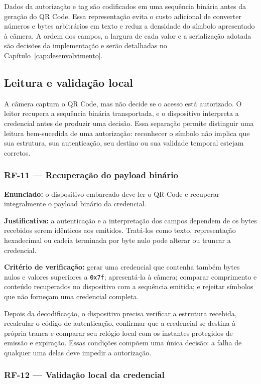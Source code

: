 Dados da autorização e tag são codificados em uma sequência binária antes da geração do QR Code. Essa representação evita o custo adicional de converter números e bytes arbitrários em texto e reduz a densidade do símbolo apresentado à câmera. A ordem dos campos, a largura de cada valor e a serialização adotada são decisões da implementação e serão detalhadas no Capítulo~\ref{cap:desenvolvimento}.

\subsection{Leitura e validação local}

A câmera captura o QR Code, mas não decide se o acesso está autorizado. O leitor recupera a sequência binária transportada, e o dispositivo interpreta a credencial antes de produzir uma decisão. Essa separação permite distinguir uma leitura bem-sucedida de uma autorização: reconhecer o símbolo não implica que sua estrutura, sua autenticação, seu destino ou sua validade temporal estejam corretos.

\subsubsection*{RF-11 --- Recuperação do payload binário}

\textbf{Enunciado:} o dispositivo embarcado deve ler o QR Code e recuperar integralmente o payload binário da credencial.

\textbf{Justificativa:} a autenticação e a interpretação dos campos dependem de os bytes recebidos serem idênticos aos emitidos. Tratá-los como texto, representação hexadecimal ou cadeia terminada por byte nulo pode alterar ou truncar a credencial.

\textbf{Critério de verificação:} gerar uma credencial que contenha também bytes nulos e valores superiores a \texttt{0x7f}; apresentá-la à câmera; comparar comprimento e conteúdo recuperados no dispositivo com a sequência emitida; e rejeitar símbolos que não forneçam uma credencial completa.

Depois da decodificação, o dispositivo precisa verificar a estrutura recebida, recalcular o código de autenticação, confirmar que a credencial se destina à própria tranca e comparar seu relógio local com os instantes protegidos de emissão e expiração. Essas condições compõem uma única decisão: a falha de qualquer uma delas deve impedir a autorização.

\subsubsection*{RF-12 --- Validação local da credencial}

